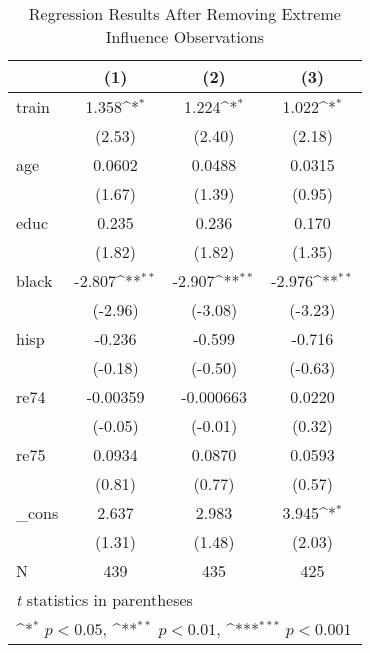 \begin{table}[htbp]\centering
\def\sym#1{\ifmmode^{#1}\else\(^{#1}\)\fi}
\caption{Regression Results After Removing Extreme Influence Observations}
\begin{tabular}{l*{3}{c}}
\hline\hline
            &\multicolumn{1}{c}{(1)}         &\multicolumn{1}{c}{(2)}         &\multicolumn{1}{c}{(3)}         \\
\hline
train       &       1.358\sym{*}  &       1.224\sym{*}  &       1.022\sym{*}  \\
            &      (2.53)         &      (2.40)         &      (2.18)         \\
[1em]
age         &      0.0602         &      0.0488         &      0.0315         \\
            &      (1.67)         &      (1.39)         &      (0.95)         \\
[1em]
educ        &       0.235         &       0.236         &       0.170         \\
            &      (1.82)         &      (1.82)         &      (1.35)         \\
[1em]
black       &      -2.807\sym{**} &      -2.907\sym{**} &      -2.976\sym{**} \\
            &     (-2.96)         &     (-3.08)         &     (-3.23)         \\
[1em]
hisp        &      -0.236         &      -0.599         &      -0.716         \\
            &     (-0.18)         &     (-0.50)         &     (-0.63)         \\
[1em]
re74        &    -0.00359         &   -0.000663         &      0.0220         \\
            &     (-0.05)         &     (-0.01)         &      (0.32)         \\
[1em]
re75        &      0.0934         &      0.0870         &      0.0593         \\
            &      (0.81)         &      (0.77)         &      (0.57)         \\
[1em]
\_cons      &       2.637         &       2.983         &       3.945\sym{*}  \\
            &      (1.31)         &      (1.48)         &      (2.03)         \\
\hline
N           &         439         &         435         &         425         \\
\hline\hline
\multicolumn{4}{l}{\footnotesize \textit{t} statistics in parentheses}\\
\multicolumn{4}{l}{\footnotesize \sym{*} \(p<0.05\), \sym{**} \(p<0.01\), \sym{***} \(p<0.001\)}\\
\end{tabular}
\end{table}
